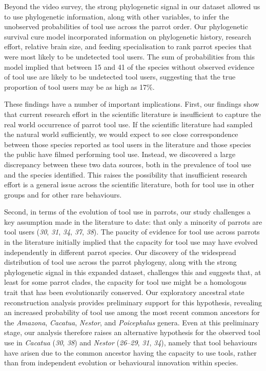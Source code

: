 \documentclass[
  man,floatsintext]{apa6}
\begin{document}
Beyond the video survey, the strong phylogenetic signal in our dataset allowed
us to use phylogenetic information, along with other variables, to infer the
unobserved probabilities of tool use across the parrot order. Our phylogenetic
survival cure model incorporated information on phylogenetic history, research
effort, relative brain size, and feeding specialisation to rank parrot species
that were most likely to be undetected tool users. The sum of probabilities from
this model implied that between 15 and 41 of the species without observed
evidence of tool use are likely to be undetected tool users, suggesting that the
true proportion of tool users may be as high as 17\%.

These findings have a number of important implications. First, our findings show
that current research effort in the scientific literature is insufficient to
capture the real world occurrence of parrot tool use. If the scientific
literature had sampled the natural world sufficiently, we would expect to see
close correspondence between those species reported as tool users in the
literature and those species the public have filmed performing tool use.
Instead, we discovered a large discrepancy between these two data sources, both
in the prevalence of tool use and the species identified. This raises the
possibility that insufficient research effort is a general issue across the
scientific literature, both for tool use in other groups and for other rare
behaviours.

Second, in terms of the evolution of tool use in parrots, our study challenges a
key assumption made in the literature to date: that only a minority of parrots
are tool users (\emph{30}, \emph{31}, \emph{34}, \emph{37}, \emph{38}).
The paucity of evidence for tool use across parrots in the literature initially
implied that the capacity for tool use may have evolved independently in
different parrot species. Our discovery of the widespread distribution of tool
use across the parrot phylogeny, along with the strong phylogenetic signal in
this expanded dataset, challenges this and suggests that, at least for some
parrot clades, the capacity for tool use might be a homologous trait that has
been evolutionarily conserved. Our exploratory ancestral state reconstruction
analysis provides preliminary support for this hypothesis, revealing an
increased probability of tool use among the most recent common ancestors for the
\emph{Amazona}, \emph{Cacatua}, \emph{Nestor}, and \emph{Poicephalus} genera. Even at this
preliminary stage, our analysis therefore raises an alternative hypothesis for
the observed tool use in \emph{Cacatua} (\emph{30}, \emph{38}) and
\emph{Nestor} (\emph{26}--\emph{29}, \emph{31}, \emph{34}), namely that tool behaviours have arisen due to the
common ancestor having the capacity to use tools, rather than from independent
evolution or behavioural innovation within species.
\end{document}
